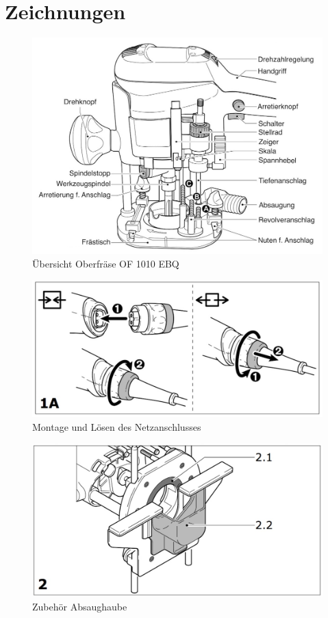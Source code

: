 \documentclass{\basedir/fablab-document}
\begin{document}
\section{Zeichnungen}
\begin{figure}[]
	\centering
	\includegraphics[width=1\textwidth]{img/festool_2.jpg}
	\caption{Übersicht Oberfräse OF 1010 EBQ}
	\label{fig:bilder1}
\end{figure}

\begin{figure}[]
	\centering
	\includegraphics[width=1\textwidth]{img/festool_3.jpg}
	\caption{Montage und Lösen des Netzanschlusses}
	\label{fig:bilder2}
\end{figure}

\begin{figure}[]
	\centering
	\includegraphics[width=1\textwidth]{img/festool_4.jpg}
	\caption{Zubehör Absaughaube}
	\label{fig:bilder3}
\end{figure}
\end{document}
